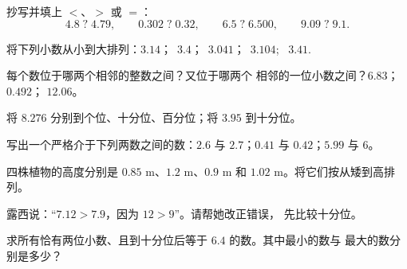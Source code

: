 \begin{exercise}[$\star$]\label{exo:g5:decimals:4}
抄写并填上 $<$、$>$ 或 $=$：
\[
4.8 \;?\; 4.79, \qquad
0.302 \;?\; 0.32, \qquad
6.5 \;?\; 6.500, \qquad
9.09 \;?\; 9.1 .
\]
\end{exercise}

\begin{exercise}[$\star$]\label{exo:g5:decimals:5}
将下列小数从小到大排列：$3.14$；\ $3.4$；\ $3.041$；\
$3.104$; \ $3.41$.
\end{exercise}

\begin{exercise}[$\star$]\label{exo:g5:decimals:6}
每个数位于哪两个相邻的整数之间？又位于哪两个
相邻的一位小数之间？\quad $6.83$；\quad $0.492$；\quad
$12.06$。
\end{exercise}

\begin{exercise}[$\star$]\label{exo:g5:decimals:7}
将 $8.276$ 分别到个位、十分位、百分位；将
$3.95$ \omterm{def:g4:numbers:round}{四舍五入}到十分位。
\end{exercise}

\begin{exercise}[$\star$]\label{exo:g5:decimals:8}
写出一个严格介于下列两数之间的数：$2.6$ 与 $2.7$；\quad $0.41$ 与
$0.42$；\quad $5.99$ 与 $6$。
\end{exercise}

\begin{exercise}[$\star$]\label{exo:g5:decimals:9}
四株植物的高度分别是 $0.85$ m、$1.2$ m、$0.9$ m 和
$1.02$ m。将它们按从矮到高排列。
\end{exercise}

\begin{exercise}[$\star\star$]\label{exo:g5:decimals:10}
露西说：“$7.12 > 7.9$，因为 $12 > 9$”。请帮她改正错误，
先比较十分位。
\end{exercise}

\begin{exercise}[$\star\star$]\label{exo:g5:decimals:11}
求所有恰有两位小数、且到十分位后等于
$6.4$ 的数。其中最小的数与
最大的数分别是多少？
\end{exercise}
